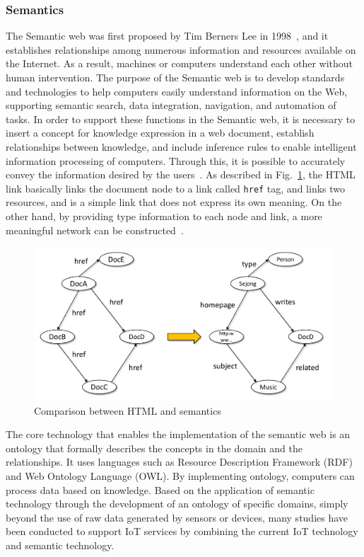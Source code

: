 \subsubsection {Semantics}
The Semantic web was first proposed by Tim Berners Lee in 1998~\cite{berners2001semantic}, and it establishes relationships among numerous information and resources available on the Internet. As a result, machines or computers understand each other without human intervention. The purpose of the Semantic web is to develop standards and technologies to help computers easily understand information on the Web, supporting semantic search, data integration, navigation, and automation of tasks. In order to support these functions in the Semantic web, it is necessary to insert a concept for knowledge expression in a web document, establish relationships between knowledge, and include inference rules to enable intelligent information processing of computers. Through this, it is possible to accurately convey the information desired by the users~\cite{ontology_web_frotoma}. As described in Fig.~\ref{fig:semantic_comparison}, the HTML link basically links the document node to a link called \texttt{href} tag, and links two resources, and is a simple link that does not express its own meaning. On the other hand, by providing type information to each node and link, a more meaningful network can be constructed~\cite{2008_semantic_books}.

\begin{figure}[H]			
	\centering
	\includegraphics[width=\textwidth]{figures/fig_semantic_comparison.pdf}
    \caption{Comparison between HTML and semantics}
    \label{fig:semantic_comparison}
\end{figure}

The core technology that enables the implementation of the semantic web is an ontology that formally describes the concepts in the domain and the relationships. It uses languages such as Resource Description Framework (RDF) and Web Ontology Language (OWL). By implementing ontology, computers can process data based on knowledge. Based on the application of semantic technology through the development of an ontology of specific domains, simply beyond the use of raw data generated by sensors or devices, many studies have been conducted to support IoT services by combining the current IoT technology and semantic technology.

